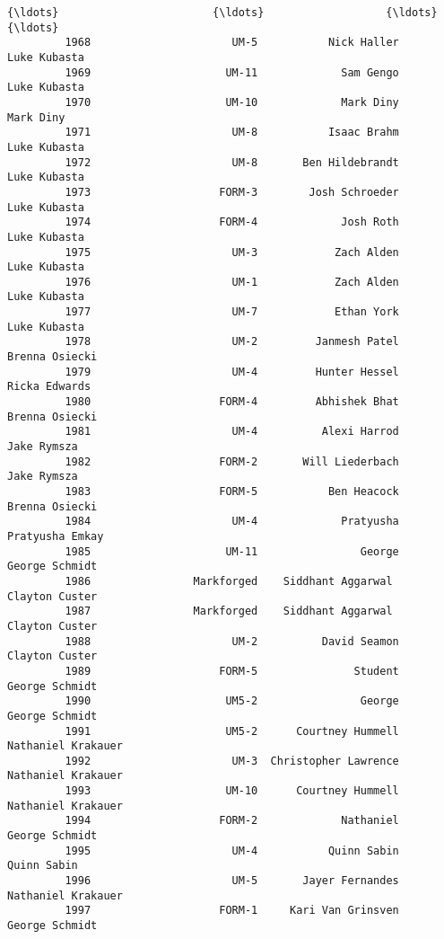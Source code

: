 \documentclass[11pt]{article}
\begin{document}
\begin{Verbatim}[commandchars=\\\{\}]
         {\ldots}                        {\ldots}                   {\ldots}                 {\ldots}   
         1968                      UM-5           Nick Haller        Luke Kubasta   
         1969                     UM-11             Sam Gengo        Luke Kubasta   
         1970                     UM-10             Mark Diny           Mark Diny   
         1971                      UM-8           Isaac Brahm        Luke Kubasta   
         1972                      UM-8       Ben Hildebrandt        Luke Kubasta   
         1973                    FORM-3        Josh Schroeder        Luke Kubasta   
         1974                    FORM-4             Josh Roth        Luke Kubasta   
         1975                      UM-3            Zach Alden        Luke Kubasta   
         1976                      UM-1            Zach Alden        Luke Kubasta   
         1977                      UM-7            Ethan York        Luke Kubasta   
         1978                      UM-2         Janmesh Patel      Brenna Osiecki   
         1979                      UM-4         Hunter Hessel       Ricka Edwards   
         1980                    FORM-4         Abhishek Bhat      Brenna Osiecki   
         1981                      UM-4          Alexi Harrod         Jake Rymsza   
         1982                    FORM-2       Will Liederbach         Jake Rymsza   
         1983                    FORM-5           Ben Heacock      Brenna Osiecki   
         1984                      UM-4             Pratyusha     Pratyusha Emkay   
         1985                     UM-11                George      George Schmidt   
         1986                Markforged    Siddhant Aggarwal       Clayton Custer   
         1987                Markforged    Siddhant Aggarwal       Clayton Custer   
         1988                      UM-2          David Seamon      Clayton Custer   
         1989                    FORM-5               Student      George Schmidt   
         1990                     UM5-2                George      George Schmidt   
         1991                     UM5-2      Courtney Hummell  Nathaniel Krakauer   
         1992                      UM-3  Christopher Lawrence  Nathaniel Krakauer   
         1993                     UM-10      Courtney Hummell  Nathaniel Krakauer   
         1994                    FORM-2             Nathaniel      George Schmidt   
         1995                      UM-4           Quinn Sabin         Quinn Sabin   
         1996                      UM-5       Jayer Fernandes  Nathaniel Krakauer   
         1997                    FORM-1     Kari Van Grinsven      George Schmidt   
         

\end{Verbatim}
\end{document}
